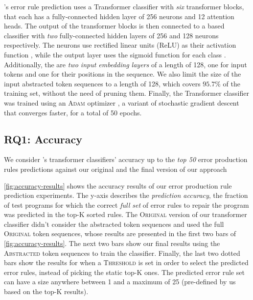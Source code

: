 \toolname's error rule prediction uses a Transformer classifier with \emph{six}
transformer blocks, that each has a fully-connected hidden layer of 256 neurons
and 12 attention heads. The output of the transformer blocks is then connected
to a \dnn based classifier with \emph{two} fully-connected hidden layers of 256
and 128 neurons respectively. The neurons use rectified linear units (ReLU) as
their activation function \citep{Nair2010-xg}, while the output layer uses the
sigmoid function for each class \citep{Nielsen2015-pu}. Additionally, the are
\emph{two input embedding layers} of a length of 128, one for input tokens and
one for their positions in the sequence. We also limit the size of the input
abstracted token sequences to a length of 128, which covers $95.7\%$ of the
training set, without the need of pruning them. Finally, the Transformer
classifier was trained using an \textsc{Adam} optimizer \citep{Kingma2014-ng}, a
variant of stochastic gradient descent that converges faster, for a total of 50
epochs.

\subsection{RQ1: Accuracy}
\label{sec:eval:accuracy}

We consider \toolname's transformer classifiers' accuracy up to the \emph{top
50} error production rules predictions against our original and the final
version of our approach



%
\autoref{fig:accuracy-results} shows the accuracy results of our error
production rule prediction experiments. The y-axis describes the
\emph{prediction accuracy}, \ie the fraction of test programs for which the
correct \emph{full set} of error rules to repair the program was predicted in
the top-K sorted rules.
%
The \textsc{Original} version of our transformer classifier didn't consider the
abstracted token sequences and used the full \textsc{Original} token sequences,
whose results are presented in the first two bars of
\autoref{fig:accuracy-results}. The next two bars show our final results using
the \textsc{Abstracted} token sequences to train the classifier. Finally, the
last two dotted bars show the results for when a \textsc{Threshold} is set in
order to select the predicted error rules, instead of picking the static top-K
ones. The predicted error rule set can have a size anywhere between 1 and a
maximum of 25 (pre-defined by us based on the top-K results).

